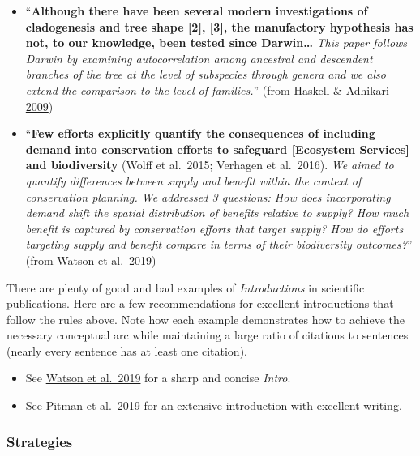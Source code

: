 \documentclass[]{book}
\begin{document}
\begin{itemize}
\item
  ``\textbf{Although there have been several modern investigations of cladogenesis and tree shape {[}2{]}, {[}3{]}, the manufactory hypothesis has not, to our knowledge, been tested since Darwin\ldots{}} \emph{This paper follows Darwin by examining autocorrelation among ancestral and descendent branches of the tree at the level of subspecies through genera and we also extend the comparison to the level of families.}'' (from \href{https://journals.plos.org/plosone/article?id=10.1371/journal.pone.0005460}{Haskell \& Adhikari 2009})
\item
  ``\textbf{Few efforts explicitly quantify the consequences of including demand into conservation efforts to safeguard {[}Ecosystem Services{]} and biodiversity} (Wolff et al.~2015; Verhagen et al.~2016). \emph{We aimed to quantify differences between supply and benefit within the context of conservation planning. We addressed 3 questions: How does incorporating demand shift the spatial distribution of benefits relative to supply? How much benefit is captured by conservation efforts that target supply? How do efforts targeting supply and benefit compare in terms of their biodiversity outcomes?}'' (from \href{https://conbio.onlinelibrary.wiley.com/doi/full/10.1111/cobi.13276}{Watson et al.~2019})
\end{itemize}

There are plenty of good and bad examples of \emph{Introductions} in scientific publications. Here are a few recommendations for excellent introductions that follow the rules above. Note how each example demonstrates how to achieve the necessary conceptual arc while maintaining a large ratio of citations to sentences (nearly every sentence has at least one citation).

\begin{itemize}
\item
  See \href{https://conbio.onlinelibrary.wiley.com/doi/full/10.1111/cobi.13276}{Watson et al.~2019} for a sharp and concise \emph{Intro}.
\item
  See \href{https://onlinelibrary.wiley.com/doi/full/10.1111/mms.12661}{Pitman et al.~2019} for an extensive introduction with excellent writing.
\end{itemize}

\hypertarget{strategies-1}{%
\subsubsection*{Strategies}\label{strategies-1}}
\end{document}

